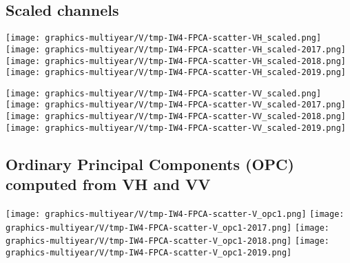 \clearpage

\subsection{Scaled channels}
\label{FPCA-scatter-scaled-IW4}

\begin{center}
\begin{minipage}{7.0in}
\texttt{[image: graphics-multiyear/V/tmp-IW4-FPCA-scatter-VH\_scaled.png]}
\quad
\texttt{[image: graphics-multiyear/V/tmp-IW4-FPCA-scatter-VH\_scaled-2017.png]}
\vskip 1.0cm
\texttt{[image: graphics-multiyear/V/tmp-IW4-FPCA-scatter-VH\_scaled-2018.png]}
\quad
\texttt{[image: graphics-multiyear/V/tmp-IW4-FPCA-scatter-VH\_scaled-2019.png]}
\end{minipage}
\end{center}


\clearpage
\begin{center}
\begin{minipage}{7.0in}
\texttt{[image: graphics-multiyear/V/tmp-IW4-FPCA-scatter-VV\_scaled.png]}
\quad
\texttt{[image: graphics-multiyear/V/tmp-IW4-FPCA-scatter-VV\_scaled-2017.png]}
\vskip 1.0cm
\texttt{[image: graphics-multiyear/V/tmp-IW4-FPCA-scatter-VV\_scaled-2018.png]}
\quad
\texttt{[image: graphics-multiyear/V/tmp-IW4-FPCA-scatter-VV\_scaled-2019.png]}
\end{minipage}
\end{center}


\clearpage

\subsection{Ordinary Principal Components (OPC) computed from VH and VV}
\label{FPCA-scatter-opc-IW4}

\begin{center}
\begin{minipage}{7.0in}
\texttt{[image: graphics-multiyear/V/tmp-IW4-FPCA-scatter-V\_opc1.png]}
\quad
\texttt{[image: graphics-multiyear/V/tmp-IW4-FPCA-scatter-V\_opc1-2017.png]}
\vskip 1.0cm
\texttt{[image: graphics-multiyear/V/tmp-IW4-FPCA-scatter-V\_opc1-2018.png]}
\quad
\texttt{[image: graphics-multiyear/V/tmp-IW4-FPCA-scatter-V\_opc1-2019.png]}
\end{minipage}
\end{center}

